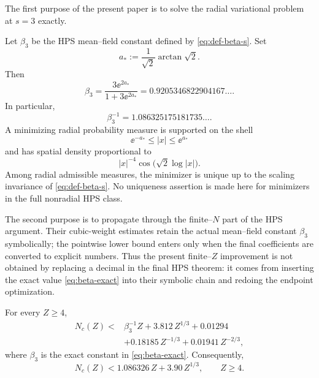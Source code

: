 The first purpose of the present paper is to solve the radial variational problem at $s=3$ exactly.

\begin{theorem}\label{thm:main}
Let $\beta_3$ be the HPS mean--field constant defined by \eqref{eq:def-beta-s}.  Set
\[
 a_*:=\frac{1}{\sqrt2}\arctan\sqrt2.
\]
Then
\begin{equation}\label{eq:beta-exact}
 \boxed{\displaystyle
 \beta_3=\frac{3\ee^{2a_*}}{1+3\ee^{2a_*}}}
 =0.9205346822904167\ldots .
\end{equation}
In particular,
\[
 \beta_3^{-1}=1.086325175181735\ldots .
\]
A minimizing radial probability measure is supported on the shell
\[
 \ee^{-a_*}\le |x|\le \ee^{a_*}
\]
and has spatial density proportional to
\[
 |x|^{-4}\cos\!\bigl(\sqrt2\log|x|\bigr).
\]
Among radial admissible measures, the minimizer is unique up to the scaling invariance of \eqref{eq:def-beta-s}.  No uniqueness assertion is made here for minimizers in the full nonradial HPS class.
\end{theorem}

The second purpose is to propagate  through the finite--$N$ part of the HPS argument.  Their cubic-weight estimates retain the actual mean--field constant $\beta_3$ symbolically; the pointwise lower bound enters only when the final coefficients are converted to explicit numbers.  Thus the present finite--$Z$ improvement is not obtained by replacing a decimal in the final HPS theorem: it comes from inserting the exact value \eqref{eq:beta-exact} into their symbolic chain and redoing the endpoint optimization.

\begin{theorem}\label{thm:finite-Z}
For every $Z\ge4$,
\begin{equation}\label{eq:finite-Z-main}
\boxed{\begin{aligned}
N_c(Z)<{}&\beta_3^{-1}Z+3.812\,Z^{1/3}+0.01294\\
&+0.18185\,Z^{-1/3}+0.01941\,Z^{-2/3},
\end{aligned}}
\end{equation}
where $\beta_3$ is the exact constant in \eqref{eq:beta-exact}.  Consequently,
\begin{equation}\label{eq:finite-Z-simple}
 \boxed{N_c(Z)<1.086326\,Z+3.90\,Z^{1/3}},\qquad Z\ge4.
\end{equation}
\end{theorem}

